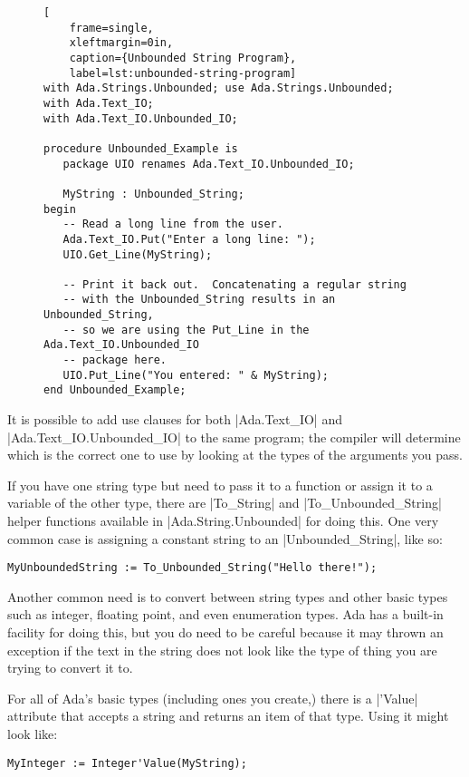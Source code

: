 \begin{figure}[tbhp]
    \begin{lstlisting}[
    frame=single,
    xleftmargin=0in,
    caption={Unbounded String Program},
    label=lst:unbounded-string-program]
with Ada.Strings.Unbounded; use Ada.Strings.Unbounded;
with Ada.Text_IO;
with Ada.Text_IO.Unbounded_IO;

procedure Unbounded_Example is
   package UIO renames Ada.Text_IO.Unbounded_IO;

   MyString : Unbounded_String;
begin
   -- Read a long line from the user.
   Ada.Text_IO.Put("Enter a long line: ");
   UIO.Get_Line(MyString);

   -- Print it back out.  Concatenating a regular string
   -- with the Unbounded_String results in an Unbounded_String,
   -- so we are using the Put_Line in the Ada.Text_IO.Unbounded_IO
   -- package here.
   UIO.Put_Line("You entered: " & MyString);
end Unbounded_Example;
 \end{lstlisting}    
\end{figure}


It is possible to add use clauses for both |Ada.Text_IO| and |Ada.Text_IO.Unbounded_IO| to the
same program; the compiler will determine which is the correct one to use by looking at the
types of the arguments you pass.

If you have one string type but need to pass it to a function or assign it to a variable of the
other type, there are |To_String| and |To_Unbounded_String| helper functions available in
|Ada.String.Unbounded| for doing this. One very common case is assigning a constant string to an
|Unbounded_String|, like so:

\begin{lstlisting}
MyUnboundedString := To_Unbounded_String("Hello there!");
\end{lstlisting}

Another common need is to convert between string types and other basic types such as integer,
floating point, and even enumeration types. Ada has a built-in facility for doing this, but you
do need to be careful because it may thrown an exception if the text in the string does not look
like the type of thing you are trying to convert it to.

For all of Ada's basic types (including ones you create,) there is a |'Value| attribute that
accepts a string and returns an item of that type. Using it might look like:

\begin{lstlisting}
MyInteger := Integer'Value(MyString);
\end{lstlisting}


